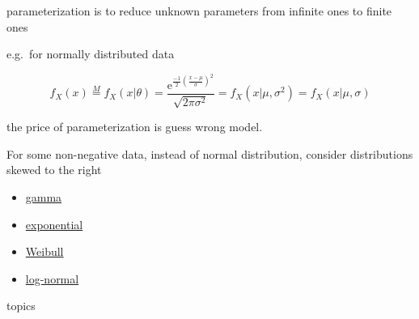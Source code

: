\documentclass[
]{book}
\providecommand{\tightlist}{%
  \setlength{\itemsep}{0pt}\setlength{\parskip}{0pt}}
\theoremstyle{definition}
\theoremstyle{definition}
\theoremstyle{definition}
\theoremstyle{definition}
\theoremstyle{remark}
\begin{document}
parameterization is to reduce unknown parameters from infinite ones to finite ones

e.g.~for normally distributed data

\[
f_{{\scriptscriptstyle X}}\left(x\right)\overset{M}{=}f_{{\scriptscriptstyle X}}\left(x|\theta\right)=\dfrac{\mathrm{e}^{{\scriptscriptstyle \frac{-1}{2}\left(\frac{x-\mu}{\sigma}\right)^{2}}}}{\sqrt{2\pi\sigma^{2}}}=f_{{\scriptscriptstyle X}}\left(x|\mu,\sigma^{2}\right)=f_{{\scriptscriptstyle X}}\left(x|\mu,\sigma\right)
\]

the price of parameterization is guess wrong model.

For some non-negative data, instead of normal distribution, consider distributions skewed to the right

\begin{itemize}
\tightlist
\item
  \href{https://en.wikipedia.org/wiki/Gamma_distribution}{gamma}
\item
  \href{https://en.wikipedia.org/wiki/Exponential_distribution}{exponential}
\item
  \href{https://en.wikipedia.org/wiki/Weibull_distribution}{Weibull}
\item
  \href{https://en.wikipedia.org/wiki/Log-normal_distribution}{log-normal}
\end{itemize}

topics
\end{document}
